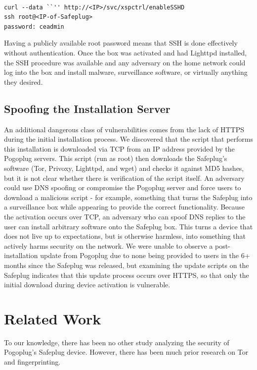 \documentclass[letterpaper,twocolumn,10pt]{article}
\begin{document}
{\tt \small
\begin{verbatim}
curl --data ``'' http://<IP>/svc/xspctrl/enableSSHD
ssh root@<IP-of-Safeplug>
password: ceadmin
\end{verbatim}
}

Having a publicly available root password means that SSH is done effectively without authentication.  Once the box was activated and had Lighttpd installed, the SSH procedure was available and any adversary on the home network could log into the box and install malware, surveillance software, or virtually anything they desired.

\subsection{Spoofing the Installation Server}
\label{dnsspoof}
An additional dangerous class of vulnerabilities comes from the lack of HTTPS during the initial installation process.  We discovered that the script that performs this installation is downloaded via TCP from an IP address provided by the Pogoplug servers.  This script (run as root) then downloads the Safeplug's software (Tor, Privoxy, Lighttpd, and wget) and checks it against MD5 hashes, but it is not clear whether there is verification of the script itself.  An adversary could use DNS spoofing or compromise the Pogoplug server and force users to download a malicious script - for example, something that turns the Safeplug into a surveillance box while appearing to provide the correct functionality.  Because the activation occurs over TCP, an adversary who can spoof DNS replies to the user can install arbitrary software onto the Safeplug box.  This turns a device that does not live up to expectations, but is otherwise harmless, into something that actively harms security on the network.  We were unable to observe a post-installation update from Pogoplug due to none being provided to users in the 6+ months since the Safeplug was released, but examining the update scripts on the Safeplug indicates that this update process occurs over HTTPS, so that only the initial download during device activation is vulnerable.

\section{Related Work}
To our knowledge, there has been no other study analyzing the security of Pogoplug's Safeplug device.  However, there has been much prior research on Tor~\cite{tor} and fingerprinting.
\end{document}
